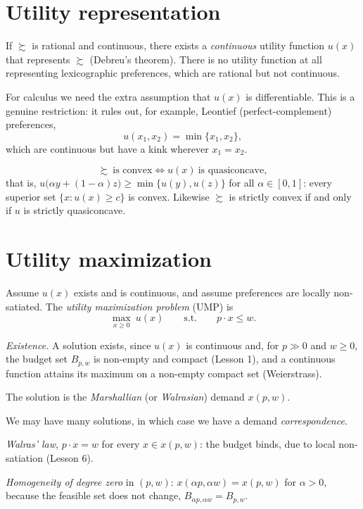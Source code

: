 \documentclass[11pt]{article}
\begin{document}
\section{Utility representation}

If $\succsim$ is rational and continuous, there exists a \emph{continuous} utility
function $u(x)$ that represents $\succsim$ (Debreu's theorem). There is no utility
function at all representing lexicographic preferences, which are rational but not
continuous.

For calculus we need the extra assumption that $u(x)$ is differentiable. This is a
genuine restriction: it rules out, for example, Leontief (perfect-complement)
preferences,
\[ u(x_1,x_2)=\min\{x_1,x_2\}, \]
which are continuous but have a kink wherever $x_1=x_2$.

\[ \succsim\ \text{is convex}\iff u(x)\ \text{is quasiconcave}, \]
that is, $u\bigl(\alpha y+(1-\alpha)z\bigr)\ge\min\{u(y),u(z)\}$ for all
$\alpha\in[0,1]$: every superior set $\{x:u(x)\ge c\}$ is convex. Likewise
$\succsim$ is strictly convex if and only if $u$ is strictly quasiconcave.


\section{Utility maximization}

Assume $u(x)$ exists and is continuous, and assume preferences are locally
non-satiated. The \emph{utility maximization problem} (UMP) is
\[ \max_{x\ge 0}\ u(x)\qquad\text{s.t.}\qquad p\cdot x\le w . \]

\begin{flatlist}
  \item \emph{Existence.} A solution exists, since $u(x)$ is continuous and, for
        $p\gg0$ and $w\ge0$, the budget set $B_{p,w}$ is non-empty and compact
        (Lesson 1), and a continuous function attains its maximum on a non-empty
        compact set (Weierstrass).
  \item The solution is the \emph{Marshallian} (or \emph{Walrasian}) demand
        $x(p,w)$.
  \item We may have many solutions, in which case we have a demand
        \emph{correspondence}.
\end{flatlist}

\begin{flatlist}
  \item \emph{Walras' law}, $p\cdot x=w$ for every $x\in x(p,w)$: the budget
        binds, due to local non-satiation (Lesson 6).
  \item \emph{Homogeneity of degree zero} in $(p,w)$:
        $x(\alpha p,\alpha w)=x(p,w)$ for $\alpha>0$, because the feasible set
        does not change, $B_{\alpha p,\alpha w}=B_{p,w}$.
\end{flatlist}
\end{document}
